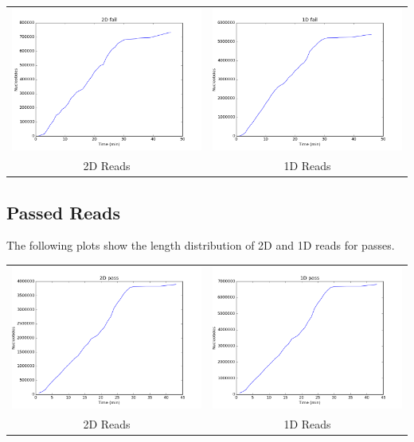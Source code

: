 \documentclass[11pt]{article}
\begin{document}
        \begin{tabular}{cc}
          \includegraphics[width=.48\textwidth]{failcum2D}
          &
          \includegraphics[width=.48\textwidth]{failcum1D}
          \\
          2D Reads
          &
          1D Reads
        \end{tabular}

\subsection*{Passed Reads}

        The following plots show the length distribution of 2D and 1D reads for passes.

        
        \begin{tabular}{cc}
          \includegraphics[width=.48\textwidth]{passcum2D}
          &
          \includegraphics[width=.48\textwidth]{passcum1D}
          \\
          2D Reads
          &
          1D Reads
        \end{tabular}
\newpage
\end{document}
